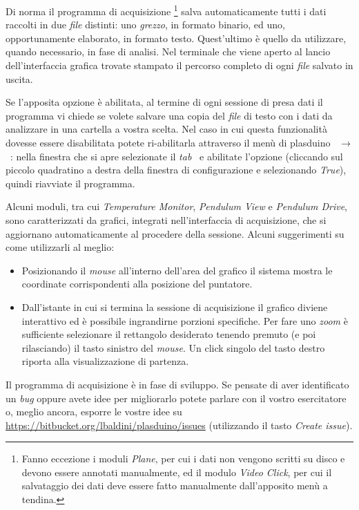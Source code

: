 \documentclass{lab1-article}
\begin{document}
\begin{article}

Di norma il programma di acquisizione%
\footnote{Fanno eccezione i moduli \emph{Plane}, per cui i dati non vengono
  scritti su disco e devono essere annotati manualmente, ed il modulo
  \emph{Video Click}, per cui il salvataggio dei dati deve essere fatto
  manualmente dall'apposito men\`u a tendina.}
salva automaticamente tutti i dati raccolti in due \emph{file} distinti: uno
\emph{grezzo}, in formato binario, ed uno, opportunamente elaborato, in formato
testo. Quest'ultimo \`e quello da utilizzare, quando necessario, in fase di
analisi. Nel terminale che viene aperto al lancio dell'interfaccia grafica
trovate stampato il percorso completo di ogni \emph{file} salvato in uscita.

Se l'apposita opzione \`e abilitata, al termine di ogni sessione di presa dati
il programma vi chiede se volete salvare una copia del \emph{file} di testo
con i dati da analizzare in una cartella a vostra scelta. Nel caso in cui
questa funzionalit\`a dovesse essere disabilitata potete ri-abilitarla
attraverso il men\`u di plasduino
~$\rightarrow$~:
nella finestra che si apre selezionate il \emph{tab}~ e abilitate
l'opzione  (cliccando sul piccolo quadratino a
destra della finestra di configurazione e selezionando \emph{True}),
quindi riavviate il programma.



Alcuni moduli, tra cui \emph{Temperature Monitor}, \emph{Pendulum View} e
\emph{Pendulum Drive}, sono caratterizzati da grafici, integrati
nell'interfaccia di acquisizione, che si aggiornano automaticamente al
procedere della sessione. Alcuni suggerimenti su come utilizzarli al meglio:
\begin{itemize}
\item Posizionando il \emph{mouse} all'interno dell'area del grafico il
  sistema mostra le coordinate corrispondenti alla posizione del
  puntatore.
\item Dall'istante in cui si termina la sessione di acquisizione il grafico
  diviene interattivo ed \`e possibile ingrandirne porzioni specifiche.
  Per fare uno \emph{zoom} \`e sufficiente selezionare il rettangolo
  desiderato tenendo premuto (e poi rilasciando) il tasto sinistro del
  \emph{mouse}. Un click singolo del tasto destro riporta alla visualizzazione
  di partenza.
\end{itemize}



Il programma di acquisizione \`e in fase di sviluppo. Se pensate di aver
identificato un \emph{bug} oppure avete idee per migliorarlo potete parlare con
il vostro esercitatore o, meglio ancora, esporre le vostre idee su
\url{https://bitbucket.org/lbaldini/plasduino/issues}
(utilizzando il tasto \emph{Create issue}).


\end{article}
\end{document}
